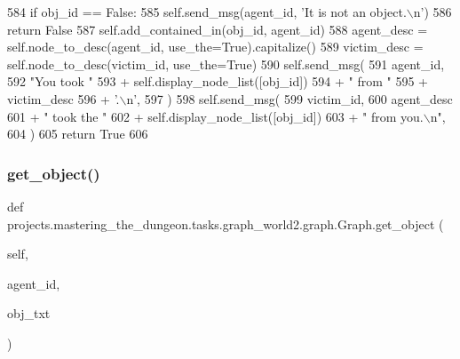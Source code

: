 \begin{DoxyCode}
584         \textcolor{keywordflow}{if} obj\_id == \textcolor{keyword}{False}:
585             self.send\_msg(agent\_id, \textcolor{stringliteral}{'It is not an object.\(\backslash\)n'})
586             \textcolor{keywordflow}{return} \textcolor{keyword}{False}
587         self.add\_contained\_in(obj\_id, agent\_id)
588         agent\_desc = self.node\_to\_desc(agent\_id, use\_the=\textcolor{keyword}{True}).capitalize()
589         victim\_desc = self.node\_to\_desc(victim\_id, use\_the=\textcolor{keyword}{True})
590         self.send\_msg(
591             agent\_id,
592             \textcolor{stringliteral}{"You took "}
593             + self.display\_node\_list([obj\_id])
594             + \textcolor{stringliteral}{" from "}
595             + victim\_desc
596             + \textcolor{stringliteral}{'.\(\backslash\)n'},
597         )
598         self.send\_msg(
599             victim\_id,
600             agent\_desc
601             + \textcolor{stringliteral}{" took the "}
602             + self.display\_node\_list([obj\_id])
603             + \textcolor{stringliteral}{" from you.\(\backslash\)n"},
604         )
605         \textcolor{keywordflow}{return} \textcolor{keyword}{True}
606 
\end{DoxyCode}
\mbox{\label{classprojects_1_1mastering__the__dungeon_1_1tasks_1_1graph__world2_1_1graph_1_1Graph_a4efc9cab1e760d98614810c72dc075ee}} 
\subsubsection{\texorpdfstring{get\+\_\+object()}{get\_object()}}
{\footnotesize\ttfamily def projects.\+mastering\+\_\+the\+\_\+dungeon.\+tasks.\+graph\+\_\+world2.\+graph.\+Graph.\+get\+\_\+object (\begin{DoxyParamCaption}\item[{}]{self,  }\item[{}]{agent\+\_\+id,  }\item[{}]{obj\+\_\+txt }\end{DoxyParamCaption})}



